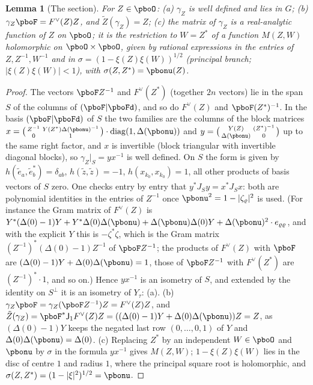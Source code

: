 \documentclass[10pt]{amsart}
\newtheorem{lemma}[theorem]{Lemma}
\theoremstyle{definition}
\theoremstyle{remark}
\begin{document}
\begin{lemma}[The section]\label{pbo:section}
For $Z\in\pboO$: (a) $\gamma_Z$ is well defined and lies in $G$; (b) $\gamma_Z\pboF=F^\vee(Z)Z$, and
$\tilde Z(\gamma_Z)=Z$; (c) the matrix of $\gamma_Z$ is a real-analytic function of $Z$ on $\pboO$; it
is the restriction to $W=Z^*$ of a function $M(Z,W)$ holomorphic on $\pboO\times\pboO$, given by
rational expressions in the entries of $Z,Z^{-1},W^{-1}$ and in $\sigma=(1-\xi(Z)\xi(W))^{1/2}$
(principal branch; $|\xi(Z)\xi(W)|<1$), with $\sigma(Z,Z^*)=\pbonu(Z)$.
\end{lemma}
\begin{proof}
The vectors $\pboF Z^{-1}$ and $F^\vee(Z^*)$ (together $2n$ vectors) lie in the span $S$ of the columns
of $(\pboF|\pboFd)$, and so do $F^\vee(Z)$ and $\pboF(Z^*)^{-1}$. In the basis $(\pboF|\pboFd)$ of $S$
the two families are the columns of the block matrices $x=\bigl(\begin{smallmatrix}Z^{-1}&Y(Z^*)
\Delta(\pbonu)^{-1}\\0&1\end{smallmatrix}\bigr)\cdot\operatorname{diag}(1,\Delta(\pbonu))$ and $y=
\bigl(\begin{smallmatrix}Y(Z)&(Z^*)^{-1}\\\Delta(\pbonu)&0\end{smallmatrix}\bigr)$ up to the same
right factor, and $x$ is invertible (block triangular with invertible diagonal blocks), so $\gamma_Z|_S
=yx^{-1}$ is well defined. On $S$ the form is given by $h(\tilde e_a,\tilde e^*_b)=\delta_{ab}$, $h(\tilde z,\tilde z)=-1$, $h(x_{k_0},x_{k_0})=1$, all other products of basis vectors
of $S$ zero. One checks entry by entry that $y^*J_Sy=x^*J_Sx$: both are polynomial identities in the
entries of $Z^{-1}$ once $\pbonu^2=1-|\zeta_\varrho|^2$ is used. (For instance the Gram matrix of
$F^\vee(Z)$ is $Y^*(\Delta(0)-1)Y+Y^*\Delta(0)\Delta(\pbonu)+\Delta(\pbonu)\Delta(0)Y+\Delta(\pbonu)^2
\cdot e_{\varrho\varrho}$, and with the explicit $Y$ this is $-\zeta^*\zeta$, which is the Gram matrix
$(Z^{-1})^*(\Delta(0)-1)Z^{-1}$ of $\pboF Z^{-1}$; the products of $F^\vee(Z)$ with $\pboF$ are
$(\Delta(0)-1)Y+\Delta(0)\Delta(\pbonu)=1$, those of $\pboF Z^{-1}$ with $F^\vee(Z^*)$ are
$(Z^{-1})^*\cdot1$, and so on.) Hence $yx^{-1}$ is an isometry of $S$, and extended by the identity
on $S^\perp$ it is an isometry of $Y_\tau$: (a). (b) $\gamma_Z\pboF=\gamma_Z(\pboF Z^{-1})Z=F^\vee(Z)Z$,
and $\tilde Z(\gamma_Z)=\pboF^*\mathsf J_1F^\vee(Z)Z=((\Delta(0)-1)Y+\Delta(0)\Delta(\pbonu))Z=Z$, as
$(\Delta(0)-1)Y$ keeps the negated last row $(0,\dots,0,1)$ of $Y$ and $\Delta(0)\Delta(\pbonu)=
\Delta(0)$. (c) Replacing $Z^*$ by an independent $W\in\pboO$ and $\pbonu$ by $\sigma$ in the formula
$yx^{-1}$ gives $M(Z,W)$; $1-\xi(Z)\xi(W)$ lies in the disc of centre $1$ and radius $1$, where the
principal square root is holomorphic, and $\sigma(Z,Z^*)=(1-|\xi|^2)^{1/2}=\pbonu$.
\end{proof}
\end{document}
